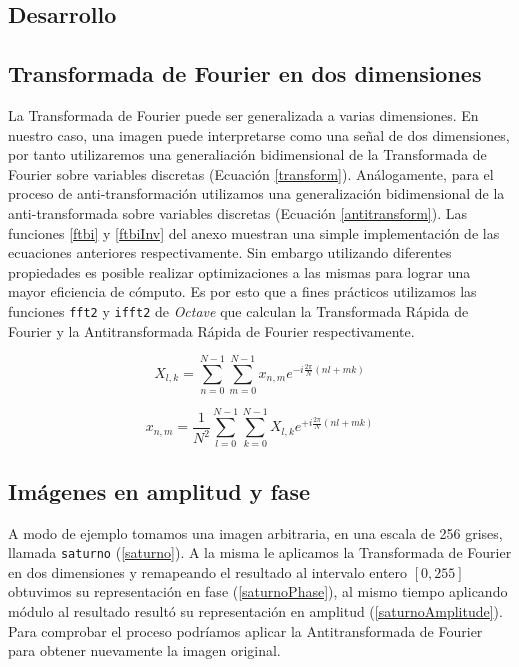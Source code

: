 \documentclass{article}
\begin{document}
\begin{multicols}{2}
\section{Desarrollo}
\subsection{Transformada de Fourier en dos dimensiones}
\label{sec1}

\par La Transformada de Fourier puede ser generalizada a varias dimensiones. En nuestro caso, una imagen puede interpretarse como una señal de dos dimensiones, por tanto utilizaremos una generaliación bidimensional de la Transformada de Fourier sobre variables discretas (Ecuación \ref{transform}). Análogamente, para el proceso de anti-transformación utilizamos una generalización bidimensional de la anti-transformada sobre variables discretas (Ecuación \ref{antitransform}). Las funciones  \ref{ftbi} y \ref{ftbiInv} del anexo muestran una simple implementación de las ecuaciones anteriores respectivamente. Sin embargo utilizando diferentes propiedades es posible realizar optimizaciones a las mismas para lograr una mayor eficiencia de cómputo. Es por esto que a fines prácticos utilizamos las funciones \verb+fft2+ y \verb+ifft2+ de \textit{Octave} que calculan la Transformada Rápida de Fourier y la Antitransformada Rápida de Fourier respectivamente.

\begin{equation}
\label{transform}
X_{l,k} = \sum_{n=0}^{N-1}\sum_{m=0}^{N-1} x_{n,m} e^{-i\frac{2\pi}{N}(nl + mk)}
\end{equation}

\begin{equation}
\label{antitransform}
x_{n,m} = \frac{1}{N^2} \sum_{l=0}^{N-1}\sum_{k=0}^{N-1} X_{l,k} e^{+i\frac{2\pi}{N}(nl + mk)}
\end{equation}

\subsection{Imágenes en amplitud y fase}
\label{sec2}


\par A modo de ejemplo tomamos una imagen arbitraria, en una escala de 256 grises, llamada \verb+saturno+ (\ref{saturno}). A la misma le aplicamos la Transformada de Fourier en dos dimensiones y remapeando el resultado al intervalo entero $[0,255]$ obtuvimos su representación en fase (\ref{saturnoPhase}), al mismo tiempo aplicando módulo al resultado resultó su representación en amplitud (\ref{saturnoAmplitude}). Para comprobar el proceso podríamos aplicar la Antitransformada de Fourier para obtener nuevamente la imagen original.


\end{multicols}
\end{document}
